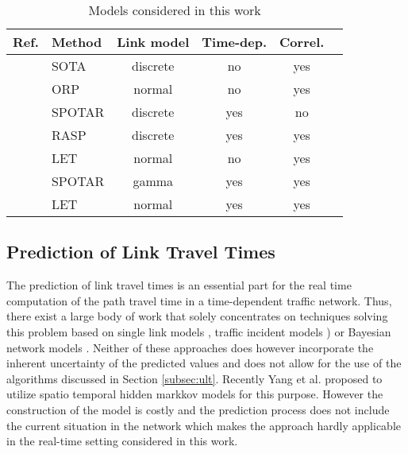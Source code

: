 \begin{table}
    \centering
  \begin{tabular}{| l || l | c | c | c | c|}
    \hline
    Ref. & Method & Link model & Time-dep. & Correl. \\
    \hline    \hline
\cite{NieFan06} & SOTA & discrete  & no & yes\\ \hline
\cite{SesSri10} & ORP & normal & no & yes\\ \hline
\cite{NieWu09} & SPOTAR & discrete & yes & no\\ \hline
\cite{NieWu09a} & RASP & discrete & yes & yes\\ \hline
\cite{CheLamLiSumYan13} & LET & normal & no & yes\\ \hline
\cite{ZocNieWuMah13} & SPOTAR & gamma & yes & yes\\ \hline
\cite{DonLiVoVu12} & LET & normal & yes & yes\\ \hline
  \end{tabular}
  \caption{Models considered in this work}
  \label{tab:methods}
  \end{table}


\subsection{Prediction of Link Travel Times}
The prediction of link travel times is an essential part for the
real time computation of the path travel time in a time-dependent
traffic network. Thus, there exist a large body of work that solely
concentrates on techniques solving this problem based on
single link models \cite{PanDS12}, traffic incident models
\cite{PanDemShaGup13}) or Bayesian network models \cite{SunZhaYu06}. Neither
of these approaches does however incorporate the inherent uncertainty of the
predicted values and does not allow for the use of the algorithms discussed in
Section \ref{subsec:ult}. Recently Yang et al.\cite{YanGuoJen13} proposed to
utilize spatio temporal hidden markkov models for this purpose. However the
construction of the model is costly and the prediction
process does not include the current situation in the network which makes the approach hardly
applicable in the real-time setting considered in this work.
